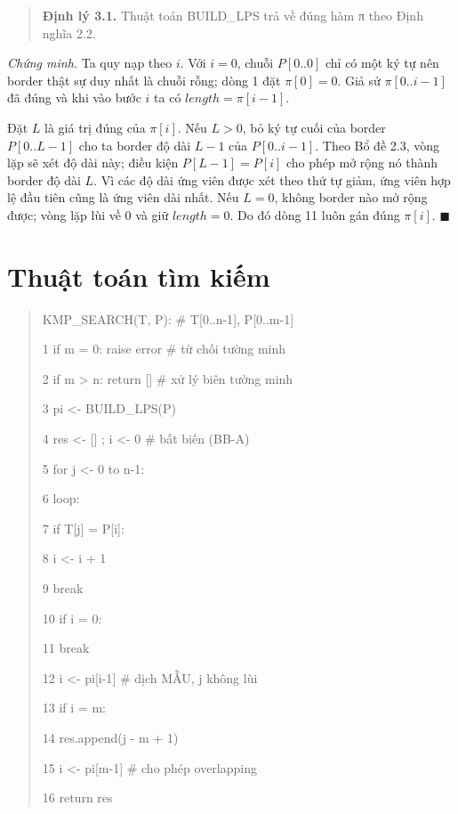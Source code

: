 \begin{quote}
\textbf{Định lý 3.1.} Thuật toán BUILD\_LPS trả về đúng hàm π theo Định
nghĩa 2.2.
\end{quote}

\emph{Chứng minh.} Ta quy nạp theo \(i\). Với \(i=0\), chuỗi
\(P[0..0]\) chỉ có một ký tự nên border thật sự duy nhất là chuỗi rỗng;
dòng 1 đặt \(\pi[0]=0\). Giả sử \(\pi[0..i-1]\) đã đúng và khi vào bước
\(i\) ta có \(\mathit{length}=\pi[i-1]\).

Đặt \(L\) là giá trị đúng của \(\pi[i]\). Nếu \(L>0\), bỏ ký tự cuối của
border \(P[0..L-1]\) cho ta border độ dài \(L-1\) của \(P[0..i-1]\).
Theo Bổ đề 2.3, vòng lặp sẽ xét độ dài này; điều kiện
\(P[L-1]=P[i]\) cho phép mở rộng nó thành border độ dài \(L\).
Vì các độ dài ứng viên được xét theo thứ tự giảm, ứng viên hợp lệ đầu
tiên cũng là ứng viên dài nhất. Nếu \(L=0\), không border nào mở rộng
được; vòng lặp lùi về 0 và giữ \(\mathit{length}=0\). Do đó dòng 11 luôn
gán đúng \(\pi[i]\). \(\blacksquare\)

\section{Thuật toán tìm kiếm}
\label{sec:3-2}

\begin{quote}
KMP\_SEARCH(T, P): \# T{[}0..n-1{]}, P{[}0..m-1{]}

1 if m = 0: raise error \# từ chối tường minh

2 if m \textgreater{} n: return {[}{]} \# xử lý biên tường minh

3 pi \textless- BUILD\_LPS(P)

4 res \textless- {[}{]} ; i \textless- 0 \# bất biến (BB-A)

5 for j \textless- 0 to n-1:

6 loop:

7 if T{[}j{]} = P{[}i{]}:

8 i \textless- i + 1

9 break

10 if i = 0:

11 break

12 i \textless- pi{[}i-1{]} \# dịch MẪU, j không lùi

13 if i = m:

14 res.append(j - m + 1)

15 i \textless- pi{[}m-1{]} \# cho phép overlapping

16 return res
\end{quote}

